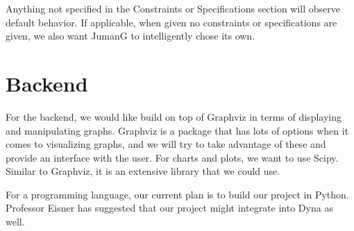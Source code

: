 \documentclass{article}
\begin{document}
Anything not specified in the Constraints or Specifications section will observe default behavior. If applicable, when given no constraints or specifications are given, we also want JumanG to intelligently chose its own.

\section{Backend}

For the backend, we would like build on top of Graphviz in terms of displaying and manipulating graphs. Graphviz is a package that has lots of options when it comes to visualizing graphs, and we will try to take advantage of these and provide an interface with the user. For charts and plots, we want to use Scipy. Similar to Graphviz, it is an extensive library that we could use.

For a programming language, our current plan is to build our project in Python. Professor Eisner has suggested that our project might integrate into Dyna as well.
\end{document}
